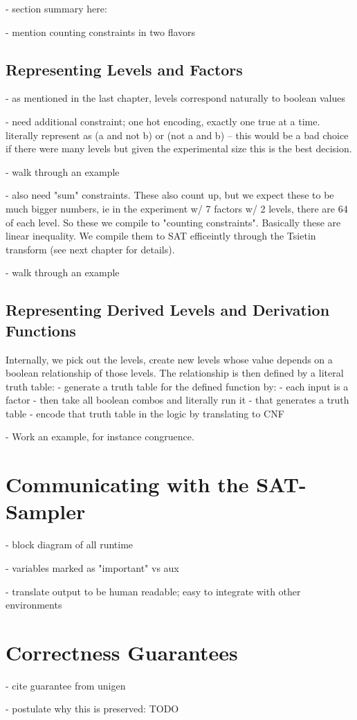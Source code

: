 - section summary here:

- mention counting constraints in two flavors

\subsection{Representing Levels and Factors}

- as mentioned in the last chapter, levels correspond naturally to boolean values

- need additional constraint; one hot encoding, exactly one true at a time. literally represent as (a and not b) or (not a and b) -- this would be a bad choice if there were many levels but given the experimental size this is the best decision.

- walk through an example

- also need "sum" constraints. These also count up, but we expect these to be much bigger numbers, ie in the experiment w/ 7 factors w/ 2 levels, there are 64 of each level. So these we compile to "counting constraints". Basically these are linear inequality. We compile them to SAT efficeintly through the Tsietin transform (see next chapter for details).

- walk through an example

\subsection{Representing Derived Levels and Derivation Functions}

Internally, we pick out the levels, create new levels whose value depends on a boolean relationship of those levels. The relationship is then defined by a literal truth table:
- generate a truth table for the defined function by:
- each input is a factor
- then take all boolean combos and literally run it
- that generates a truth table
- encode that truth table in the logic by translating to CNF

- Work an example, for instance congruence.

\section{Communicating with the SAT-Sampler}

- block diagram of all runtime

- variables marked as "important" vs aux

- translate output to be human readable; easy to integrate with other environments


\section{Correctness Guarantees}

- cite guarantee from unigen

- postulate why this is preserved: TODO
